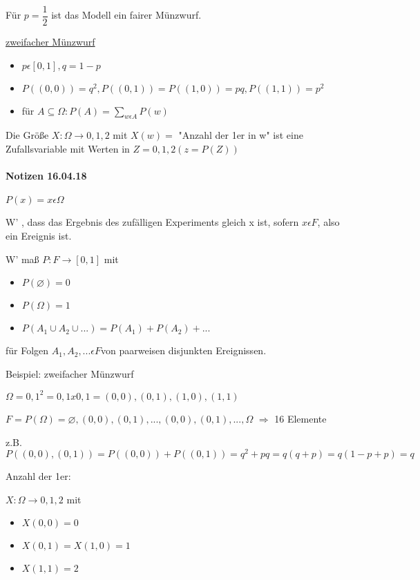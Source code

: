 \documentclass[paper=a4, fontsize=11pt]{scrartcl}
\numberwithin{equation}{section}
\numberwithin{figure}{section}
\numberwithin{table}{section}
\begin{document}
Für $p= \dfrac{1}{2}$ ist das Modell ein fairer Münzwurf.

\underline{zweifacher Münzwurf}
\begin{itemize}
\item $p \epsilon [0,1], q = 1-p$
\item $P({(0,0)}) = q^{2}, P({(0,1)})=P({(1,0)})= pq, P({(1,1)})= p^{2}$
\item für $A \subseteq \Omega : P(A) = \sum _{w \epsilon A} P({w})$
\end{itemize}

Die Größe $X: \Omega \rightarrow {0,1,2}$ mit $X(w)=$ "Anzahl der 1er in w" ist eine Zufallsvariable mit Werten in $Z = {0,1,2} (z = P (Z))$

\paragraph{Notizen 16.04.18}
$P ({x}) = x \epsilon \Omega $

W' , dass das Ergebnis des zufälligen Experiments gleich x ist, sofern ${x} \epsilon F$, also ein Ereignis ist.

W' maß $P: F \rightarrow [0,1]$ mit 
\begin{itemize}
\item $P( \varnothing ) = 0$
\item $P( \Omega ) = 1$
\item $P(A_{1} \cup A_{2} \cup ... ) = P(A_{1})+P(A_{2})+... $
\end{itemize}
für Folgen $A_{1}, A_{2},... \epsilon F$von paarweisen disjunkten Ereignissen.

Beispiel: zweifacher Münzwurf

$\Omega = {0,1} ^{2} = {0,1} x {0,1} = {(0,0),(0,1),(1,0),(1,1)}$

$F = P( \Omega ) = {\varnothing , {(0,0)}, {(0,1)}, ... , {(0,0),(0,1)}, ... , \Omega }$ $\Rightarrow$ 16 Elemente

z.B. $P({(0,0),(0,1)}) = P({(0,0)})+P({(0,1)}) = q^{2}+ pq = q (q+p) = q (1-p+p) = q $

Anzahl der 1er:

$X: \Omega \rightarrow {0,1,2}$ mit
\begin{itemize}
\item $X(0,0)=0$
\item $X(0,1)= X(1,0)=1$
\item $X(1,1)= 2$
\end{itemize}
\end{document}
